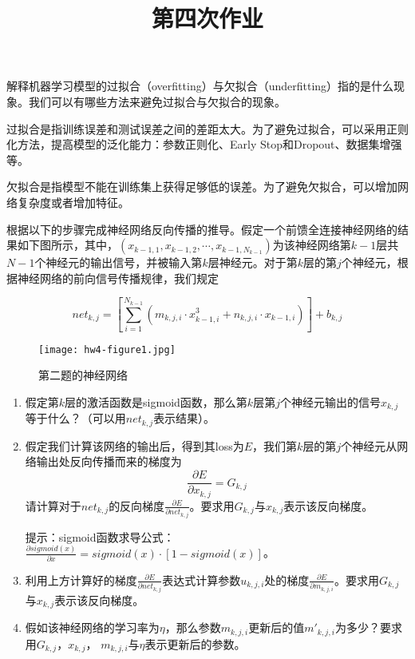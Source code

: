 
    \title{第四次作业}
    \maketitle

    \begin{problem}
        解释机器学习模型的过拟合（overfitting）与欠拟合（underfitting）指的是什么现象。我们可以有哪些方法来避免过拟合与欠拟合的现象。
    \end{problem}

    \begin{solution}
        过拟合是指训练误差和测试误差之间的差距太大。为了避免过拟合，可以采用正则化方法，提高模型的泛化能力：参数正则化、Early Stop和Dropout、数据集增强等。

        欠拟合是指模型不能在训练集上获得足够低的误差。为了避免欠拟合，可以增加网络复杂度或者增加特征。
    \end{solution}

    \begin{problem}
根据以下的步骤完成神经网络反向传播的推导。假定一个前馈全连接神经网络的结果如下图所示，其中，$(x_{k-1, 1}, x_{k-1, 2}, \cdots, x_{k-1, N_{k-1}})$为该神经网络第$k-1$层共$N-1$个神经元的输出信号，并被输入第$k$层神经元。对于第$k$层的第$j$个神经元，根据神经网络的前向信号传播规律，我们规定
    \end{problem}
\begin{equation}
    net_{k,j} = [\sum_{i=1}^{N_{k-1}} (m_{k,j,i}\cdot x_{k-1, i}^3 + n_{k, j, i}\cdot x_{k-1, i})] + b_{k, j} 
\end{equation}
\begin{figure}[H]
    \centering
    \texttt{[image: hw4-figure1.jpg]}
    \caption{第二题的神经网络}
\end{figure}

\begin{enumerate}
    \item 假定第$k$层的激活函数是sigmoid函数，那么第$k$层第$j$个神经元输出的信号$x_{k,j}$等于什么？（可以用$net_{k,j}$表示结果）。
    \item 假定我们计算该网络的输出后，得到其loss为$E$，我们第$k$层的第$j$个神经元从网络输出处反向传播而来的梯度为
\begin{equation}
    \frac{\partial E}{\partial x_{k, j}} = G_{k, j}
\end{equation}
    请计算对于$net_{k, j}$的反向梯度$\frac{\partial E}{\partial net_{k, j}}$。要求用$G_{k,j}$与$x_{k,j}$表示该反向梯度。
    
    提示：sigmoid函数求导公式：$\frac{\partial sigmoid(x)}{\partial x} = sigmoid(x)\cdot [1-sigmoid(x)]$。
    \item 利用上方计算好的梯度$\frac{\partial E}{\partial net_{k, j}}$表达式计算参数$u_{k,j,i}$处的梯度$\frac{\partial E}{\partial m_{k,j,i}}$。要求用$G_{k,j}$与$x_{k,j}$表示该反向梯度。
    \item 假如该神经网络的学习率为$\eta$，那么参数$m_{k, j, i}$更新后的值$m'_{k, j, i}$为多少？要求用$G_{k,j}$，$x_{k,j}$， $m_{k, j, i}$与$\eta$表示更新后的参数。
\end{enumerate}

